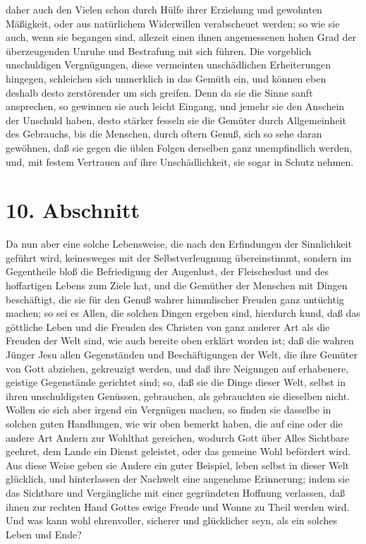 daher auch den Vielen schon durch Hülfe ihrer Erziehung und gewohnten Mäßigkeit,
oder aus natürlichem Widerwillen verabscheuet werden; so wie sie auch, wenn sie
begangen sind, allezeit einen ihnen angemessenen hohen Grad der überzeugenden
Unruhe und Bestrafung mit sich führen. Die vorgeblich unschuldigen Vergnügungen,
diese vermeinten unschädlichen Erheiterungen hingegen, schleichen sich
unmerklich in das Gemüth ein, und können eben deshalb desto zerstörender um sich
greifen. Denn da sie die Sinne sanft ansprechen, so gewinnen sie auch leicht
Eingang, und jemehr sie den Anschein der Unschuld haben, desto stärker fesseln
sie die Gemüter durch Allgemeinheit des Gebrauchs, bis die Menschen, durch
oftern Genuß, sich so sehe daran gewöhnen, daß sie gegen die üblen Folgen
derselben ganz unempfindlich werden, und, mit festem Vertrauen auf ihre
Unschädlichkeit, sie sogar in Schutz nehmen.

\section{10. Abschnitt}

Da nun aber eine solche Lebensweise, die nach den Erfindungen der Sinnlichkeit
geführt wird, keinesweges mit der Selbstverleugnung übereinstimmt, sondern im
Gegentheile bloß die Befriedigung der Augenlust, der Fleischeslust und des
hoffartigen Lebens zum Ziele hat, und die Gemüther der Menschen mit Dingen
beschäftigt, die sie für den Genuß wahrer himmlischer Freuden ganz untüchtig
machen; so sei es Allen, die solchen Dingen ergeben sind, hierdurch kund, daß
das göttliche Leben und die Freuden des Christen von ganz anderer Art als die
Freuden der Welt sind, wie auch bereite oben erklärt worden ist; daß die wahren
Jünger Jesu allen Gegenständen und Beschäftigungen der Welt, die ihre Gemüter
von Gott abziehen, gekreuzigt werden, und daß ihre Neigungen auf erhabenere,
geistige Gegenstände gerichtet sind; so, daß sie die Dinge dieser Welt, selbst
in ihren unschuldigsten Genüssen, gebrauchen, als gebrauchten sie dieselben
nicht. Wollen sie sich aber irgend ein Vergnügen machen, so finden sie dasselbe
in solchen guten Handlungen, wie wir oben bemerkt haben, die auf eine oder die
andere Art Andern zur Wohlthat gereichen, wodurch Gott über Alles Sichtbare
geehret, dem Lande ein Dienst geleistet, oder das gemeine Wohl befördert wird.
Aus diese Weise geben sie Andere ein guter Beispiel, leben selbst in dieser Welt
glücklich, und hinterlassen der Nachwelt eine angenehme Erinnerung; indem sie
das Sichtbare und Vergängliche mit einer gegründeten Hoffnung verlassen, daß
ihnen zur rechten Hand Gottes ewige Freude und Wonne zu Theil werden wird. Und
was kann wohl ehrenvoller, sicherer und glücklicher seyn, als ein solches Leben
und Ende?
